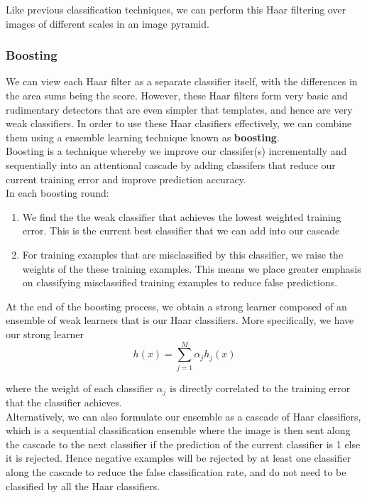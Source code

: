 \documentclass[12pt]{article}
\begin{document}
Like previous classification techniques, we can perform this Haar filtering over images of different scales in an image pyramid.

\subsubsection{Boosting}

We can view each Haar filter as a separate classifier itself, with the differences in the area sums being the score. However, these Haar filters form very basic and rudimentary detectors that are even simpler that templates, and hence are very weak classifiers. In order to use these Haar clasifiers effectively, we can combine them using a ensemble learning technique known as \textbf{boosting}.\\

Boosting is a technique whereby we improve our classifer(s) incrementally and sequentially into an attentional cascade by adding classifers that reduce our current training error and improve prediction accuracy.\\

In each boosting round:
\begin{enumerate}
\item We find the the weak classifier that achieves the lowest weighted training error. This is the current best classifier that we can add into our cascade
\item For training examples that are misclassified by this classifier, we raise the weights of the these training examples. This means we place greater emphasis on classifying misclassified training examples to reduce false predictions.
\end{enumerate}

At the end of the boosting process, we obtain a strong learner composed of an ensemble of weak learners that is our Haar classifiers. More specifically, we have our strong learner
\begin{equation}
h(x) = \sum_{j=1}^M \alpha_j h_j(x)
\end{equation}

where the weight of each classifier $\alpha_j$ is directly correlated to the training error that the classifier achieves.\\

Alternatively, we can also formulate our ensemble as a cascade of Haar classifiers, which is a sequential classification ensemble where the image is then sent along the cascade to the next classifier if the prediction of the current classifier is 1 else it is rejected. Hence negative examples will be rejected by at least one classifier along the cascade to reduce the false classification rate, and do not need to be classified by all the Haar classifiers.\\
\end{document}
